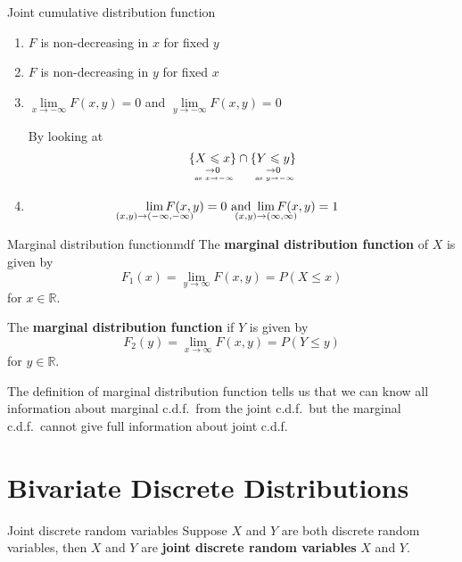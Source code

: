 \begin{Definition}{Joint cumulative distribution function}{}
    \begin{enumerate}[label=(\Roman*)]
        \item $ F $ is non-decreasing in $ x $ for fixed $ y $
        \item $ F $ is non-decreasing in $ y $ for fixed $ x $
        \item $ \displaystyle \lim\limits_{{x} \to {-\infty}} F(x,y)=0 $
              and $ \displaystyle \lim\limits_{{y} \to {-\infty}} F(x,y)=0 $

              By looking at
              \[ \underset{\underset{\text{ as }x\to-\infty}{\to 0}}{\{X\leqslant x\}}\cap
                  \underset{\underset{\text{ as }y\to-\infty}{\to 0}}{\{Y\leqslant y\}} \]
        \item \[ \displaystyle
                  \smashoperator{\lim\limits_{{(x,y)} \to {(-\infty,-\infty)}}}
                  F(x,y)=0\text{ and }
                  \displaystyle
                  \smashoperator{\lim\limits_{{(x,y)} \to {(\infty,\infty)}}}
                  F(x,y)=1 \]
    \end{enumerate}
\end{Definition}

\begin{Definition}{Marginal distribution function}{mdf}
    The \textbf{marginal distribution function} of $ X $ is given by
    \[ F_1(x)=\lim\limits_{{y} \to {\infty}} F(x,y)=P(X\leqslant x) \]
    for $ x\in\mathbb{R} $.

    The \textbf{marginal distribution function} if $ Y $ is given by
    \[ F_2(y)=\lim\limits_{{x} \to {\infty}} F(x,y)=P(Y\leqslant y) \]
    for $ y\in\mathbb{R} $.
\end{Definition}
\begin{Remark}{}{}
    The definition of marginal distribution
    function tells us that we can know all information
    about marginal c.d.f.\ from the joint c.d.f.\ but the
    marginal c.d.f.\ cannot give full information about
    joint c.d.f.\
\end{Remark}
\section{Bivariate Discrete Distributions}
\begin{Definition}{Joint discrete random variables}{}
    Suppose $ X $ and $ Y $ are both discrete random variables,
    then $ X $ and $ Y $ are \textbf{joint discrete random variables}
    $ X $ and $ Y $.
\end{Definition}

